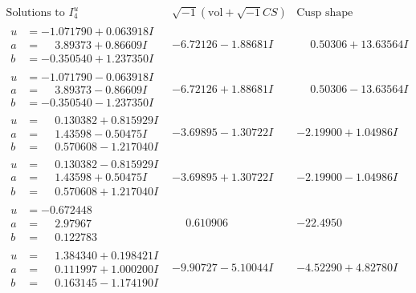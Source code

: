 \documentclass[1p]{elsarticle_modified}
\theoremstyle{definition}
\newcommand{\I}{\sqrt{-1}}
\begin{document}
$$\begin{array}{c|c|c}  
\text{Solutions to }I^u_{4}& \I (\text{vol} + \sqrt{-1}CS) & \text{Cusp shape}\\
 \hline 
\begin{aligned}
u &= -1.071790 + 0.063918 I \\
a &= \phantom{-}3.89373 + 0.86609 I \\
b &= -0.350540 + 1.237350 I\end{aligned}
 & -6.72126 - 1.88681 I & \phantom{-}0.50306 + 13.63564 I \\ \hline\begin{aligned}
u &= -1.071790 - 0.063918 I \\
a &= \phantom{-}3.89373 - 0.86609 I \\
b &= -0.350540 - 1.237350 I\end{aligned}
 & -6.72126 + 1.88681 I & \phantom{-}0.50306 - 13.63564 I \\ \hline\begin{aligned}
u &= \phantom{-}0.130382 + 0.815929 I \\
a &= \phantom{-}1.43598 - 0.50475 I \\
b &= \phantom{-}0.570608 - 1.217040 I\end{aligned}
 & -3.69895 - 1.30722 I & -2.19900 + 1.04986 I \\ \hline\begin{aligned}
u &= \phantom{-}0.130382 - 0.815929 I \\
a &= \phantom{-}1.43598 + 0.50475 I \\
b &= \phantom{-}0.570608 + 1.217040 I\end{aligned}
 & -3.69895 + 1.30722 I & -2.19900 - 1.04986 I \\ \hline\begin{aligned}
u &= -0.672448\phantom{ +0.000000I} \\
a &= \phantom{-}2.97967\phantom{ +0.000000I} \\
b &= \phantom{-}0.122783\phantom{ +0.000000I}\end{aligned}
 & \phantom{-}0.610906\phantom{ +0.000000I} & -22.4950\phantom{ +0.000000I} \\ \hline\begin{aligned}
u &= \phantom{-}1.384340 + 0.198421 I \\
a &= \phantom{-}0.111997 + 1.000200 I \\
b &= \phantom{-}0.163145 - 1.174190 I\end{aligned}
 & -9.90727 - 5.10044 I & -4.52290 + 4.82780 I \\ \hline\begin{aligned}

\end{aligned}
\end{array}$$
\end{document}
